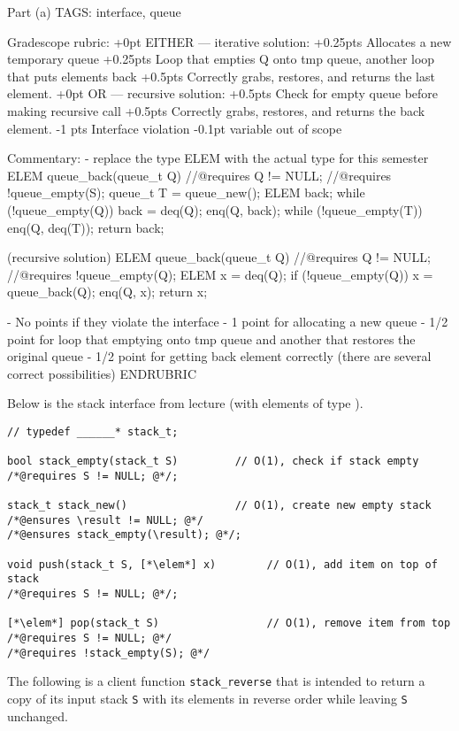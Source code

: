 \begin{parts}
\RUBRIC
Part (a)
TAGS: interface, queue

Gradescope rubric:
+0pt EITHER --- iterative solution:
+0.25pts Allocates a new temporary queue
+0.25pts Loop that empties Q onto tmp queue, another loop that puts elements back
+0.5pts Correctly grabs, restores, and returns the last element.
+0pt OR --- recursive solution:
+0.5pts Check for empty queue before making recursive call
+0.5pts Correctly grabs, restores, and returns the back element.
-1 pts Interface violation
-0.1pt variable out of scope

Commentary:
- replace the type ELEM with the actual type for this semester
ELEM queue_back(queue_t Q)
//@requires Q != NULL;
//@requires !queue_empty(S);
{
  queue_t T = queue_new();
  ELEM back;
  while (!queue_empty(Q)) {
      back = deq(Q);
      enq(Q, back);
    }
  while (!queue_empty(T)) {
    enq(Q, deq(T));
  }
  return back;
}

(recursive solution)
ELEM queue_back(queue_t Q)
//@requires Q != NULL;
//@requires !queue_empty(Q);
{
  ELEM x = deq(Q);
  if (!queue_empty(Q))
    x = queue_back(Q);
  enq(Q, x);
  return x;
}

  - No points if they violate the interface
  - 1 point for allocating a new queue
  - 1/2 point for loop that emptying onto tmp queue and another that restores the original queue
  - 1/2 point for getting back element correctly (there are several correct possibilities)
ENDRUBRIC


\newpage
\begin{EnvUplevel}
Below is the stack interface from lecture (with elements of type
\texttt{\elem}).
\begin{lstlisting}
// typedef ______* stack_t;

bool stack_empty(stack_t S)         // O(1), check if stack empty
/*@requires S != NULL; @*/;

stack_t stack_new()                 // O(1), create new empty stack
/*@ensures \result != NULL; @*/
/*@ensures stack_empty(\result); @*/;

void push(stack_t S, [*\elem*] x)        // O(1), add item on top of stack
/*@requires S != NULL; @*/;

[*\elem*] pop(stack_t S)                 // O(1), remove item from top
/*@requires S != NULL; @*/
/*@requires !stack_empty(S); @*/
\end{lstlisting}

The following is a client function \lstinline'stack_reverse' that is
intended to return a copy of its input stack \lstinline'S' with its
elements in reverse order while leaving \lstinline'S' unchanged.


\end{EnvUplevel}
\end{parts}
